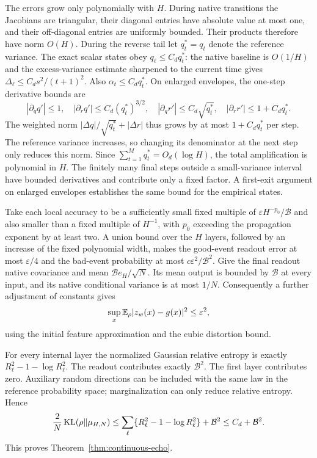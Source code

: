 The errors grow only polynomially with $H$. During native transitions the Jacobians are triangular, their diagonal entries have absolute value at most one, and their off-diagonal entries are uniformly bounded. Their products therefore have norm $O(H)$. During the reverse tail let $q_t^*=q_t$ denote the reference variance. The exact scalar states obey $q_\ell\le C_dq_t^*$: the native baseline is $O(1/H)$ and the excess-variance estimate sharpened to the current time gives $\Delta_\ell\le C_ds^2/(t+1)^2$. Also $\alpha_t\le C_dq_t^*$. On enlarged envelopes, the one-step derivative bounds are
\[
 |\partial_q q'|\le1,\quad
 |\partial_r q'|\le C_d(q_t^*)^{3/2},\quad
 |\partial_q r'|\le C_d\sqrt{q_t^*},\quad
 |\partial_r r'|\le1+C_dq_t^*.
\]
The weighted norm $|\Delta q|/\sqrt{q_t^*}+|\Delta r|$ thus grows by at most $1+C_dq_t^*$ per step. The reference variance increases, so changing its denominator at the next step only reduces this norm. Since $\sum_{t=1}^M q_t^*=O_d(\log H)$, the total amplification is polynomial in $H$. The finitely many final steps outside a small-variance interval have bounded derivatives and contribute only a fixed factor. A first-exit argument on enlarged envelopes establishes the same bound for the empirical states.

Take each local accuracy to be a sufficiently small fixed multiple of $\varepsilon H^{-p_0}/\mathcal B$ and also smaller than a fixed multiple of $H^{-1}$, with $p_0$ exceeding the propagation exponent by at least two. A union bound over the $H$ layers, followed by an increase of the fixed polynomial width, makes the good-event readout error at most $\varepsilon/4$ and the bad-event probability at most $c\varepsilon^2/\mathcal B^2$. Give the final readout native covariance and mean $\mathcal B e_H/\sqrt N$. Its mean output is bounded by $\mathcal B$ at every input, and its native conditional variance is at most $1/N$. Consequently a further adjustment of constants gives
\[
 \sup_x\mathbb E_\rho|z_w(x)-g(x)|^2\le\varepsilon^2,
\]
using the initial feature approximation and the cubic distortion bound.

For every internal layer the normalized Gaussian relative entropy is exactly $R_\ell^2-1-\log R_\ell^2$. The readout contributes exactly $\mathcal B^2$. The first layer contributes zero. Auxiliary random directions can be included with the same law in the reference probability space; marginalization can only reduce relative entropy. Hence
\[
 \frac2N\operatorname{KL}(\rho\|\mu_{H,N})
 \le\sum_\ell\{R_\ell^2-1-\log R_\ell^2\}+\mathcal B^2
 \le C_d+\mathcal B^2.
\]
This proves Theorem~\ref{thm:continuous-echo}.

